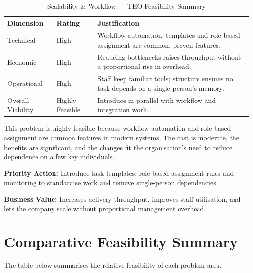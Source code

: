 \documentclass[12pt,a4paper]{report}
\begin{document}
\begin{table}[H]
\centering
\renewcommand{\arraystretch}{1.3}
\begin{tabularx}{\textwidth}{|p{3cm}|p{2.5cm}|X|}
\hline
\rowcolor{secondary}
\textbf{Dimension} & \textbf{Rating} & \textbf{Justification} \\
\hline
Technical & High & Workflow automation, templates and role-based assignment are common, proven features. \\
\hline
Economic & High & Reducing bottlenecks raises throughput without a proportional rise in overhead. \\
\hline
Operational & High & Staff keep familiar tools; structure ensures no task depends on a single person's memory. \\
\hline
Overall Viability & Highly Feasible & Introduce in parallel with workflow and integration work. \\
\hline
\end{tabularx}
\caption{Scalability \& Workflow --- TEO Feasibility Summary}
\end{table}

\begin{summaryBox}
This problem is highly feasible because workflow automation and role-based assignment are common features in modern systems. The cost is moderate, the benefits are significant, and the changes fit the organisation's need to reduce dependence on a few key individuals.
\end{summaryBox}

\begin{recommendBox}
\textbf{Priority Action:} Introduce task templates, role-based assignment rules and monitoring to standardise work and remove single-person dependencies.

\textbf{Business Value:} Increases delivery throughput, improves staff utilisation, and lets the company scale without proportional management overhead.
\end{recommendBox}

\section{Comparative Feasibility Summary}
The table below summarises the relative feasibility of each problem area.
\end{document}
